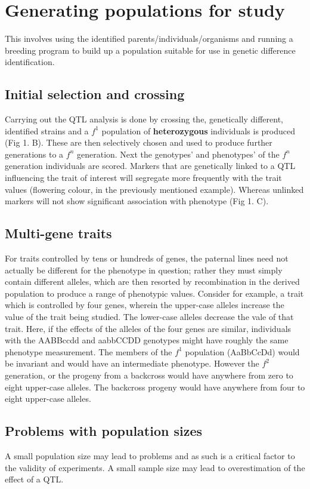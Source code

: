 \documentclass[a4paper]{article}
\begin{document}
\section{Generating populations for study}
\label{sec-4}
This involves using the identified parents/individuals/organisms and running a breeding program to build up a population suitable 
for use in genetic difference identification.

\subsection{Initial selection and crossing}
\label{sec-4-1}
Carrying out the QTL analysis is done by crossing the, genetically different, identified strains and a $f^1$ population of \textbf{heterozygous} 
individuals is produced (Fig 1. B). These are then selectively chosen and used to produce further generations to a $f^n$ generation.
Next the genotypes' and phenotypes' of the $f^n$ generation individuals are scored. Markers that are genetically linked to a QTL influencing
the trait of interest will segregate more frequently with the trait values (flowering colour, in the previously mentioned example). Whereas unlinked markers
will not show significant association with phenotype (Fig 1. C). 

\subsection{Multi-gene traits}
\label{sec-4-2}
For traits controlled by tens or hundreds of genes, the paternal lines need not actually be different for the phenotype in question; 
rather they must simply contain different alleles, which are then resorted by recombination in the derived population to produce 
a range of phenotypic values. Consider for example, a trait which is controlled by four genes, wherein the upper-case alleles increase the value 
of the trait being studied. The lower-case alleles decrease the vale of that trait. Here, if the effects of the alleles of the four genes are 
similar, individuals with the AABBccdd and aabbCCDD genotypes might have roughly the same phenotype measurement. The members of the $f^1$ population 
(AaBbCcDd) would be invariant and would have an intermediate phenotype. However the $f^2$ generation, or the progeny from a backcross would have
anywhere from zero to eight upper-case alleles. The backcross progeny would have anywhere from four to eight upper-case alleles. 

\subsection{Problems with population sizes}
\label{sec-4-3}
A small population size may lead to problems and as such is a critical factor to the validity of experiments. A small sample size may 
lead to overestimation of the effect of a QTL. 
\end{document}
